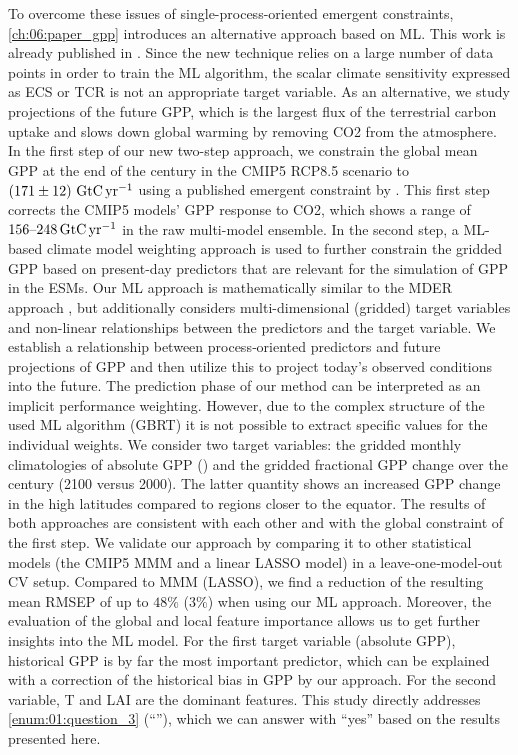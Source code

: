 To overcome these issues of single-process-oriented emergent constraints,
\cref{ch:06:paper_gpp} introduces an alternative approach based on \ac{ML}.
This work is already published in \textcite{Schlund2020}. Since the new
technique relies on a large number of data points in order to train the \ac{ML}
algorithm, the scalar climate sensitivity expressed as \ac{ECS} or \ac{TCR} is
not an appropriate target variable. As an alternative, we study projections of
the future \ac{GPP}, which is the largest flux of the terrestrial carbon uptake
and slows down global warming by removing \ac{CO2} from the atmosphere. In the
first step of our new two-step approach, we constrain the global mean \ac{GPP}
at the end of the  century in the \acs{CMIP}5 \acs{RCP}8.5 scenario to
$\pmrangeunit{171}{12}{\GtCyr{}}$ using a published emergent constraint by
\textcite{Wenzel2016}. This first step corrects the \acs{CMIP}5 models' GPP
response to \ac{CO2}, which shows a range of $\rangeunit{156}{248}{\GtCyr{}}$
in the raw multi-model ensemble. In the second step, a \ac{ML}-based climate
model weighting approach is used to further constrain the gridded \ac{GPP}
based on present-day predictors that are relevant for the simulation of
\ac{GPP} in the \acp{ESM}. Our \ac{ML} approach is mathematically similar to
the \ac{MDER} approach \autocite{Karpechko2013, Senftleben2020, Wenzel2016a},
but additionally considers multi-dimensional (gridded) target variables and
non-linear relationships between the predictors and the target variable. We
establish a relationship between process‐oriented predictors and future
projections of \ac{GPP} and then utilize this to project today's observed
conditions into the future. The prediction phase of our method can be
interpreted as an implicit performance weighting. However, due to the complex
structure of the used \ac{ML} algorithm (\ac{GBRT}) it is not possible to
extract specific values for the individual weights. We consider two target
variables: the gridded monthly climatologies of absolute \ac{GPP}
() and the gridded fractional \ac{GPP} change over the
 century (2100 versus 2000). The latter quantity shows an increased
\acs{GPP} change in the high latitudes compared to regions closer to the
equator. The results of both approaches are consistent with each other and with
the global constraint of the first step. We validate our approach by comparing
it to other statistical models (the \acs{CMIP}5 \ac{MMM} and a linear
\ac{LASSO} model) in a leave‐one‐model‐out \ac{CV} setup. Compared to \ac{MMM}
(\ac{LASSO}), we find a reduction of the resulting mean \ac{RMSEP} of up to $48
\unit{\%}$ ($3 \unit{\%}$) when using our \ac{ML} approach. Moreover, the
evaluation of the global and local feature importance allows us to get further
insights into the \ac{ML} model. For the first target variable (absolute
\ac{GPP}), historical \ac{GPP} is by far the most important predictor, which
can be explained with a correction of the historical bias in \ac{GPP} by our
approach. For the second variable, \ac{T} and \ac{LAI} are the dominant
features. This study directly addresses \cref{enum:01:question_3}
(\enquote{\emph{\KeyScienceQuestionThree{}}}), which we can answer with
\enquote{yes} based on the results presented here.


